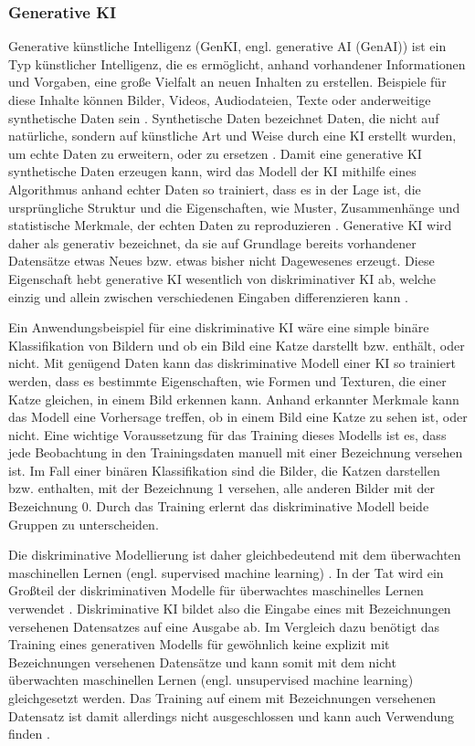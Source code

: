 \subsubsection{Generative KI}
\label{sec2:sota:subsubsec:genai}
Generative künstliche Intelligenz (GenKI, engl. generative AI (GenAI)) ist ein Typ künstlicher Intelligenz, die es ermöglicht, anhand vorhandener Informationen und Vorgaben, eine große Vielfalt an neuen Inhalten zu erstellen.
Beispiele für diese Inhalte können Bilder, Videos, Audiodateien, Texte oder anderweitige synthetische Daten sein \cite{gen-ai-tech-target}.
Synthetische Daten bezeichnet Daten, die nicht auf natürliche, sondern auf künstliche Art und Weise durch eine KI erstellt wurden, um echte Daten zu erweitern, oder zu ersetzen \cite{synt-data-ibm}.
Damit eine generative KI synthetische Daten erzeugen kann, wird das Modell der KI mithilfe eines Algorithmus anhand echter Daten so trainiert, dass es in der Lage ist, die ursprüngliche Struktur und die Eigenschaften, wie Muster, Zusammenhänge und statistische Merkmale, der echten Daten zu reproduzieren \cite{synth-data-eu, synth-mostlyai}.
Generative KI wird daher als generativ bezeichnet, da sie auf Grundlage bereits vorhandener Datensätze etwas Neues bzw. etwas bisher nicht Dagewesenes erzeugt.
Diese Eigenschaft hebt generative KI wesentlich von diskriminativer KI ab, welche einzig und allein zwischen verschiedenen Eingaben differenzieren kann \cite{computer-woche-genai}.

Ein Anwendungsbeispiel für eine diskriminative KI wäre eine simple binäre Klassifikation von Bildern und ob ein Bild eine Katze darstellt bzw. enthält, oder nicht.
Mit genügend Daten kann das diskriminative Modell einer KI so trainiert werden, dass es bestimmte Eigenschaften, wie Formen und Texturen, die einer Katze gleichen, in einem Bild erkennen kann.
Anhand erkannter Merkmale kann das Modell eine Vorhersage treffen, ob in einem Bild eine Katze zu sehen ist, oder nicht.
Eine wichtige Voraussetzung für das Training dieses Modells ist es, dass jede Beobachtung in den Trainingsdaten manuell mit einer Bezeichnung versehen ist.
Im Fall einer binären Klassifikation sind die Bilder, die Katzen darstellen bzw. enthalten, mit der Bezeichnung 1 versehen, alle anderen Bilder mit der Bezeichnung 0.
Durch das Training erlernt das diskriminative Modell beide Gruppen zu unterscheiden.

Die diskriminative Modellierung ist daher gleichbedeutend mit dem überwachten maschinellen Lernen (engl. supervised machine learning) \cite{orlly-deep-gen-learning}.
In der Tat wird ein Großteil der diskriminativen Modelle für überwachtes maschinelles Lernen verwendet \cite{turing-genai}.
Diskriminative KI bildet also die Eingabe eines mit Bezeichnungen versehenen Datensatzes auf eine Ausgabe ab.
Im Vergleich dazu benötigt das Training eines generativen Modells für gewöhnlich keine explizit mit Bezeichnungen versehenen Datensätze und kann somit mit dem nicht überwachten maschinellen Lernen (engl. unsupervised machine learning) gleichgesetzt werden.
Das Training auf einem mit Bezeichnungen versehenen Datensatz ist damit allerdings nicht ausgeschlossen und kann auch Verwendung finden \cite{orlly-deep-gen-learning}.

